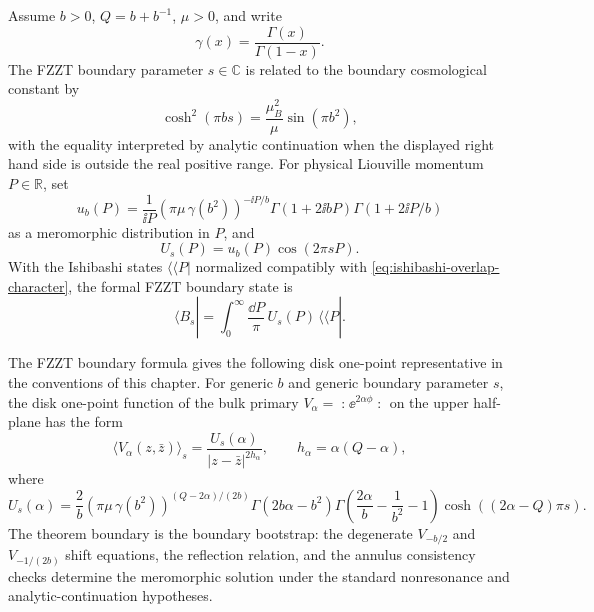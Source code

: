 \begin{definition}
\label{def:fzzt-wavefunction}
Assume \(b>0\), \(Q=b+b^{-1}\), \(\mu>0\), and write
\[
  \gamma(x)=\frac{\Gamma(x)}{\Gamma(1-x)} .
\]
The FZZT boundary parameter \(s\in\mathbb C\) is related to the boundary
cosmological constant by
\begin{equation}
  \cosh^2(\pi b s)
  =
  \frac{\mu_B^2}{\mu}\sin(\pi b^2),
  \label{eq:fzzt-mub-s-relation}
\end{equation}
with the equality interpreted by analytic continuation when the displayed
right hand side is outside the real positive range.  For physical Liouville
momentum \(P\in\mathbb R\), set
\begin{equation}
  u_b(P)
  =
  \frac1{\ii P}
  \left(\pi\mu\,\gamma(b^2)\right)^{-\ii P/b}
  \Gamma(1+2\ii bP)\Gamma(1+2\ii P/b)
  \label{eq:fzzt-u-wavefunction}
\end{equation}
as a meromorphic distribution in \(P\), and
\begin{equation}
  U_s(P)=u_b(P)\cos(2\pi sP).
  \label{eq:fzzt-p-wavefunction}
\end{equation}
With the Ishibashi states \(\langle\!\langle P|\) normalized compatibly with
\eqref{eq:ishibashi-overlap-character}, the formal FZZT boundary state is
\begin{equation}
  \langle B_s|
  =
  \int_0^\infty \frac{\dd P}{\pi}\,
  U_s(P)\,\langle\!\langle P| .
  \label{eq:fzzt-boundary-state}
\end{equation}
\end{definition}

\begin{quotedtheorem}
\label{qthm:fzzt-one-point-function}
The FZZT boundary formula
\cite{FZZ2000,Teschner2000,AngRemySun2025} gives the following disk
one-point representative in the conventions of this chapter.  For generic
\(b\) and generic boundary parameter \(s\), the disk one-point function of
the bulk primary \(V_\alpha=\mathopen{:}\ee^{2\alpha\phi}\mathclose{:}\) on
the upper half-plane has the form
\begin{equation}
  \langle V_\alpha(z,\bar z)\rangle_s
  =
  \frac{U_s(\alpha)}{|z-\bar z|^{2h_\alpha}},
  \qquad h_\alpha=\alpha(Q-\alpha),
  \label{eq:fzzt-disk-one-point-form}
\end{equation}
where
\begin{equation}
  U_s(\alpha)
  =
  \frac2b
  \left(\pi\mu\,\gamma(b^2)\right)^{(Q-2\alpha)/(2b)}
  \Gamma(2b\alpha-b^2)
  \Gamma\!\left(\frac{2\alpha}{b}-\frac1{b^2}-1\right)
  \cosh\!\left((2\alpha-Q)\pi s\right).
  \label{eq:fzzt-alpha-one-point}
\end{equation}
The theorem boundary is the boundary bootstrap: the degenerate
\(V_{-b/2}\) and \(V_{-1/(2b)}\) shift equations, the reflection relation,
and the annulus consistency checks determine the meromorphic solution under
the standard nonresonance and analytic-continuation hypotheses.
\end{quotedtheorem}

